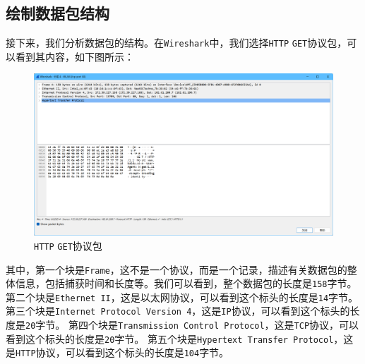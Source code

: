 \documentclass{article}
\begin{document}
\subsection{绘制数据包结构}

接下来，我们分析数据包的结构。在\texttt{Wireshark}中，我们选择\texttt{HTTP} \texttt{GET}协议包，可以看到其内容，如下图所示：

\begin{figure}[H]
  \centering
  \includegraphics[width=15cm]{images/04.png}
  \caption{\texttt{HTTP} \texttt{GET}协议包}
\end{figure}

其中，第一个块是\texttt{Frame}，这不是一个协议，而是一个记录，描述有关数据包的整体信息，包括捕获时间和长度等。我们可以看到，整个数据包的长度是\texttt{158}字节。
第二个块是\texttt{Ethernet II}，这是以太网协议，可以看到这个标头的长度是\texttt{14}字节。
第三个块是\texttt{Internet Protocol Version 4}，这是\texttt{IP}协议，可以看到这个标头的长度是\texttt{20}字节。
第四个块是\texttt{Transmission Control Protocol}，这是\texttt{TCP}协议，可以看到这个标头的长度是\texttt{20}字节。
第五个块是\texttt{Hypertext Transfer Protocol}，这是\texttt{HTTP}协议，可以看到这个标头的长度是\texttt{104}字节。
\end{document}
